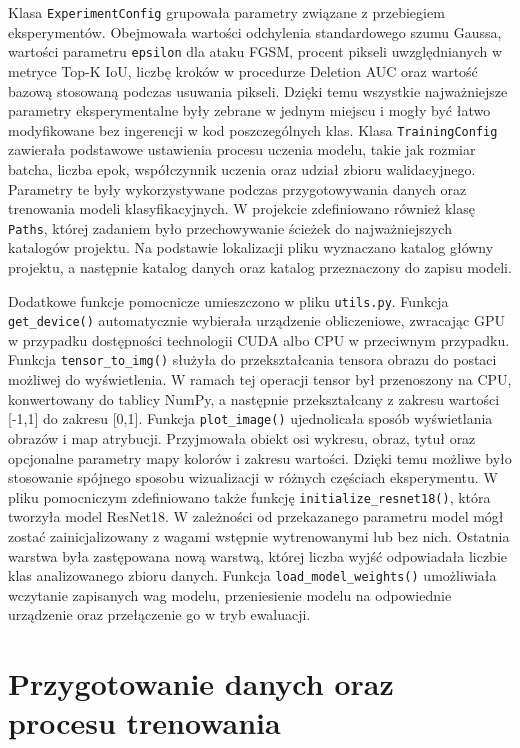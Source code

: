 Klasa \texttt{ExperimentConfig} grupowała parametry związane z przebiegiem eksperymentów. Obejmowała wartości odchylenia standardowego szumu Gaussa, wartości parametru \texttt{epsilon} dla ataku FGSM, procent pikseli uwzględnianych w metryce Top-K IoU, liczbę kroków w procedurze Deletion AUC oraz wartość bazową stosowaną podczas usuwania pikseli. Dzięki temu wszystkie najważniejsze parametry eksperymentalne były zebrane w jednym miejscu i mogły być łatwo modyfikowane bez ingerencji w kod poszczególnych klas. Klasa \texttt{TrainingConfig} zawierała podstawowe ustawienia procesu uczenia modelu, takie jak rozmiar batcha, liczba epok, współczynnik uczenia oraz udział zbioru walidacyjnego. Parametry te były wykorzystywane podczas przygotowywania danych oraz trenowania modeli klasyfikacyjnych. W projekcie zdefiniowano również klasę \texttt{Paths}, której zadaniem było przechowywanie ścieżek do najważniejszych katalogów projektu. Na podstawie lokalizacji pliku wyznaczano katalog główny projektu, a następnie katalog danych oraz katalog przeznaczony do zapisu modeli.

Dodatkowe funkcje pomocnicze umieszczono w pliku \texttt{utils.py}. Funkcja \texttt{get\_device()} automatycznie wybierała urządzenie obliczeniowe, zwracając GPU w przypadku dostępności technologii CUDA albo CPU w przeciwnym przypadku. Funkcja \texttt{tensor\_to\_img()} służyła do przekształcania tensora obrazu do postaci możliwej do wyświetlenia. W ramach tej operacji tensor był przenoszony na CPU, konwertowany do tablicy NumPy, a następnie przekształcany z zakresu wartości [-1,1] do zakresu [0,1]. Funkcja \texttt{plot\_image()} ujednolicała sposób wyświetlania obrazów i map atrybucji. Przyjmowała obiekt osi wykresu, obraz, tytuł oraz opcjonalne parametry mapy kolorów i zakresu wartości. Dzięki temu możliwe było stosowanie spójnego sposobu wizualizacji w różnych częściach eksperymentu. W pliku pomocniczym zdefiniowano także funkcję \texttt{initialize\_resnet18()}, która tworzyła model ResNet18. W zależności od przekazanego parametru model mógł zostać zainicjalizowany z wagami wstępnie wytrenowanymi lub bez nich. Ostatnia warstwa była zastępowana nową warstwą, której liczba wyjść odpowiadała liczbie klas analizowanego zbioru danych. Funkcja \texttt{load\_model\_weights()} umożliwiała wczytanie zapisanych wag modelu, przeniesienie modelu na odpowiednie urządzenie oraz przełączenie go w tryb ewaluacji.

\section{Przygotowanie danych oraz procesu trenowania}
\label{sec:dane_i_trening}

